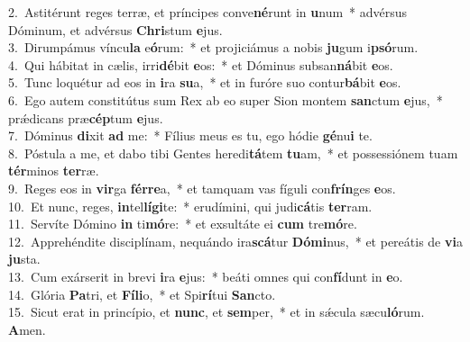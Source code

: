 {2.~}Astitérunt reges terræ, et príncipes conve\textbf{né}runt in \textbf{u}num~* advérsus Dóminum, et advérsus \textbf{Chri}stum \textbf{e}jus.\\
{3.~}Dirumpámus víncu\textbf{la} e\textbf{ó}rum:~* et projiciámus a nobis \textbf{ju}gum i\textbf{psó}rum.\\
{4.~}Qui hábitat in cælis, irri\textbf{dé}bit \textbf{e}os:~* et Dóminus subsan\textbf{ná}bit \textbf{e}os.\\
{5.~}Tunc loquétur ad eos in \textbf{i}ra \textbf{su}a,~* et in furóre suo contur\textbf{bá}bit \textbf{e}os.\\
{6.~}Ego autem constitútus sum Rex ab eo super Sion montem \textbf{san}ctum \textbf{e}jus,~* prǽdicans præ\textbf{cép}tum \textbf{e}jus.\\
{7.~}Dóminus \textbf{di}xit \textbf{ad} me:~* Fílius meus es tu, ego hódie \textbf{gé}nu\textbf{i} te.\\
{8.~}Póstula a me, et dabo tibi Gentes heredi\textbf{tá}tem \textbf{tu}am,~* et possessiónem tuam \textbf{tér}minos \textbf{ter}ræ.\\
{9.~}Reges eos in \textbf{vir}ga \textbf{fér}\textbf{re}a,~* et tamquam vas fíguli con\textbf{frín}ges \textbf{e}os.\\
{10.~}Et nunc, reges, \textbf{in}tel\textbf{lí}\textbf{gi}te:~* erudímini, qui judi\textbf{cá}tis \textbf{ter}ram.\\
{11.~}Servíte Dómino \textbf{in} ti\textbf{mó}re:~* et exsultáte ei \textbf{cum} tre\textbf{mó}re.\\
{12.~}Apprehéndite disciplínam, nequándo ira\textbf{scá}tur \textbf{Dó}\textbf{mi}nus,~* et pereátis de \textbf{vi}a \textbf{ju}sta.\\
{13.~}Cum exárserit in brevi \textbf{i}ra \textbf{e}jus:~* beáti omnes qui con\textbf{fí}dunt in \textbf{e}o.\\
{14.~}Glória \textbf{Pa}tri, et \textbf{Fí}\textbf{li}o,~* et Spi\textbf{rí}tui \textbf{San}cto.\\
{15.~}Sicut erat in princípio, et \textbf{nunc}, et \textbf{sem}per,~* et in sǽcula sæcu\textbf{ló}rum. \textbf{A}men.\\
